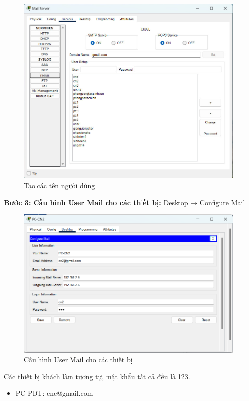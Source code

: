 \documentclass[12pt, a4paper]{article}
\begin{document}
\begin{flushleft}
\begin{itemize}[leftmargin=0.75cm]
\begin{figure}[H]
				\centering
				\includegraphics[width=1\textwidth]{users_creation.jpg}
				\caption{Tạo các tên người dùng}
			\end{figure}
		\end{itemize}
		\newpage
		\textbf{Bước 3: Cấu hình User Mail cho các thiết bị:} Desktop → Configure Mail 
		\begin{figure}[H]
			\centering
			\includegraphics[width=1\textwidth]{users_config.png}
			\caption{Cấu hình User Mail cho các thiết bị}
		\end{figure}
		Các thiết bị khách làm tương tự, mật khẩu tất cả đều là 123.
		\begin{itemize}[leftmargin=0.75cm]
			\item PC-PĐT: cnc@gmail.com

\end{itemize}
\end{flushleft}
\end{document}
